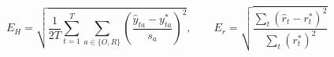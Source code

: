 \documentclass{article}
\begin{document}
\fontsize{22}{29}\selectfont
\[
E_{H}=\sqrt{\frac1{2T}\sum_{t=1}^{T}\sum_{a\in\{O,R\}}\left(\frac{\hat y_{ta}-y^*_{ta}}{s_a}\right)^2},\qquad E_r=\sqrt{\frac{\sum_t(\hat r_t-r_t^*)^2}{\sum_t(r_t^*)^2}}
\]
\end{document}
